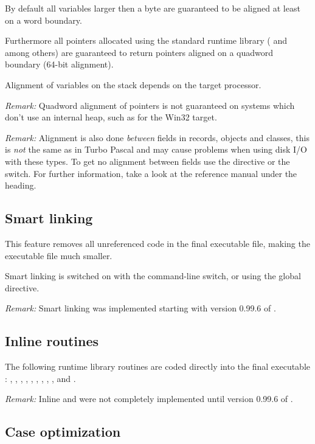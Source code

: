 \documentclass{report}
\begin{document}
By default all variables larger then a byte are guaranteed to be aligned
at least on a word boundary.

Furthermore all pointers allocated using the standard runtime
library ( and  among others) are guaranteed
to return pointers aligned on a quadword boundary (64-bit alignment).

Alignment of variables on the stack depends on the target processor.

\emph{ Remark: } Quadword alignment of pointers is not guaranteed
on systems which don't use an internal heap, such as for the Win32
target.

\emph{ Remark: } Alignment is also done \emph{between} fields in
records, objects and classes, this is \emph{not} the same as
in Turbo Pascal and may cause problems when using disk I/O with these
types. To get no alignment between fields use the  directive
or the  switch. For further information, take a
look at the reference manual under the  heading.

\subsection{ Smart linking }

This feature removes all unreferenced code in the final executable
file, making the executable file much smaller.

Smart linking is switched on with the  command-line switch, or
using the  global directive.

\emph{ Remark: } Smart linking was implemented starting with
version 0.99.6 of \fpc.

\subsection{ Inline routines }

The following runtime library routines are coded directly into the
final executable : , , , ,
, , , , ,
 and .

\emph{ Remark: } Inline  and  were not completely
implemented until version 0.99.6 of \fpc.

\subsection{ Case optimization }
\end{document}
